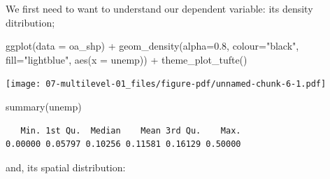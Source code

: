 \documentclass[
  letterpaper,
  DIV=11,
  numbers=noendperiod,
  oneside]{scrreprt}
\newenvironment{Shaded}{\begin{snugshade}}{\end{snugshade}}
\newcommand{\AttributeTok}[1]{\textcolor[rgb]{0.40,0.45,0.13}{#1}}
\newcommand{\FloatTok}[1]{\textcolor[rgb]{0.68,0.00,0.00}{#1}}
\newcommand{\FunctionTok}[1]{\textcolor[rgb]{0.28,0.35,0.67}{#1}}
\newcommand{\NormalTok}[1]{\textcolor[rgb]{0.00,0.23,0.31}{#1}}
\newcommand{\SpecialCharTok}[1]{\textcolor[rgb]{0.37,0.37,0.37}{#1}}
\newcommand{\StringTok}[1]{\textcolor[rgb]{0.13,0.47,0.30}{#1}}
\begin{document}
We first need to want to understand our dependent variable: its density
ditribution;

\begin{Shaded}
\begin{Highlighting}[]
\FunctionTok{ggplot}\NormalTok{(}\AttributeTok{data =}\NormalTok{ oa\_shp) }\SpecialCharTok{+}
  \FunctionTok{geom\_density}\NormalTok{(}\AttributeTok{alpha=}\FloatTok{0.8}\NormalTok{, }\AttributeTok{colour=}\StringTok{"black"}\NormalTok{, }\AttributeTok{fill=}\StringTok{"lightblue"}\NormalTok{, }\FunctionTok{aes}\NormalTok{(}\AttributeTok{x =}\NormalTok{ unemp)) }\SpecialCharTok{+}
   \FunctionTok{theme\_plot\_tufte}\NormalTok{()}
\end{Highlighting}
\end{Shaded}

\texttt{[image: 07-multilevel-01\_files/figure-pdf/unnamed-chunk-6-1.pdf]}

\begin{Shaded}
\begin{Highlighting}[]
\FunctionTok{summary}\NormalTok{(unemp)}
\end{Highlighting}
\end{Shaded}

\begin{verbatim}
   Min. 1st Qu.  Median    Mean 3rd Qu.    Max. 
0.00000 0.05797 0.10256 0.11581 0.16129 0.50000 
\end{verbatim}

and, its spatial distribution:
\end{document}
